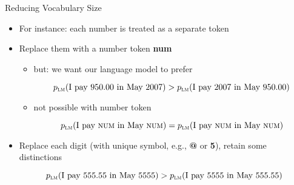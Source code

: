 \documentclass[compress]{beamer}
\begin{document}

\begin{frame}{Reducing Vocabulary Size}
\begin{itemize}
\item For instance: each number is treated as a separate token
\item Replace them with a number token {\bf \sc num}
\begin{itemize}
\item but: we want our language model to prefer

\begin{equation*}
p_\text{\sc lm}(\mbox{I pay 950.00 in May 2007}) > p_\text{\sc lm}(\mbox{I pay 2007 in May 950.00})
\end{equation*}

\item not possible with number token

\begin{equation*}
p_\text{\sc lm}(\mbox{I pay {\sc num} in May {\sc num}}) = p_\text{\sc lm}(\mbox{I pay {\sc num} in May {\sc num}})
\end{equation*}

\end{itemize}
\item Replace each digit (with unique symbol, e.g., {\bf @} or {\bf 5}), retain some distinctions

\begin{equation*}
p_\text{\sc lm}(\mbox{I pay 555.55 in May 5555}) > p_\text{\sc lm}(\mbox{I pay 5555 in May 555.55})
\end{equation*}
\end{itemize}

\end{frame}



\end{document}

